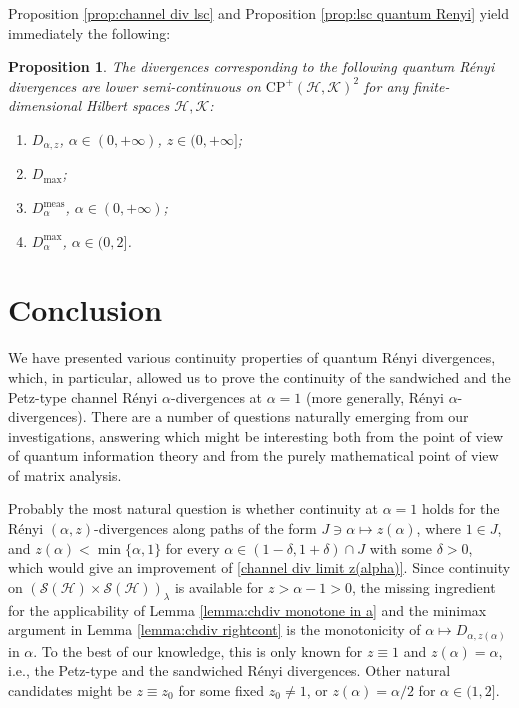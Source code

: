 \documentclass[unsortedaddress,superscriptaddress,pra,notitlepage]{revtex4}
\newtheorem{prop}[definition]{Proposition}
\def\S{{\mathcal S}}
\def\hil{{\mathcal H}}
\def\kil{{\mathcal K}}
\def\CP{\mathrm{CP}}
\def\meas{\mathrm{meas}}
\def\cpso{\text{CPSO} }
\begin{document}
Proposition \ref{prop:channel div lsc} and Proposition \ref{prop:lsc quantum Renyi} yield immediately the following:

\begin{prop}
The \cpso divergences corresponding to the following quantum R\'enyi divergences are lower semi-continuous on 
$\CP^+(\hil,\kil)^2$ for any finite-dimensional Hilbert spaces $\hil,\kil$:
\begin{enumerate}
\item
$D_{\alpha,z}$, $\alpha\in(0,+\infty)$, $z\in(0,+\infty]$; 
\item
$D_{\max}$;
\item
$D_{\alpha}^{\meas}$, $\alpha\in(0,+\infty)$;
\item
$D_{\alpha}^{\max}$, $\alpha\in(0,2]$.
\end{enumerate}
\end{prop}


\section{Conclusion}

We have presented various continuity properties of quantum R\'enyi divergences, which, in particular, allowed us to prove the continuity of the sandwiched 
and the Petz-type channel R\'enyi $\alpha$-divergences at $\alpha=1$
(more generally, \cpso R\'enyi $\alpha$-divergences).
There are a number of questions naturally emerging from our investigations, answering which might be interesting
both from the point of view of quantum information theory and from the purely mathematical point of view of matrix analysis.

Probably the most natural question is whether 
continuity at $\alpha=1$ holds for the \cpso R\'enyi 
$(\alpha,z)$-divergences 
along paths of the form $J\ni\alpha\mapsto z(\alpha)$, 
where $1\in J$, and $z(\alpha)<\min\{\alpha,1\}$ for every
$\alpha\in(1-\delta,1+\delta)\cap J$ with some $\delta>0$, which would give an improvement 
of \eqref{channel div limit z(alpha)}.
Since continuity on $(\S(\hil)\times\S(\hil))_{\lambda}$ is available for 
$z>\alpha-1>0$, the missing ingredient for the applicability of 
Lemma \ref{lemma:chdiv monotone in a} and the
minimax argument in Lemma \ref{lemma:chdiv rightcont} is the monotonicity of 
$\alpha\mapsto D_{\alpha,z(\alpha)}$ in 
$\alpha$. 
To the best of our knowledge, this is only known for $z\equiv 1$ and $z(\alpha)=\alpha$, i.e., the Petz-type and the sandwiched R\'enyi divergences. 
Other natural candidates might be $z\equiv z_0$ for some fixed $z_0\ne 1$, 
or $z(\alpha)=\alpha/2$ for $\alpha\in(1,2]$. 
\end{document}
